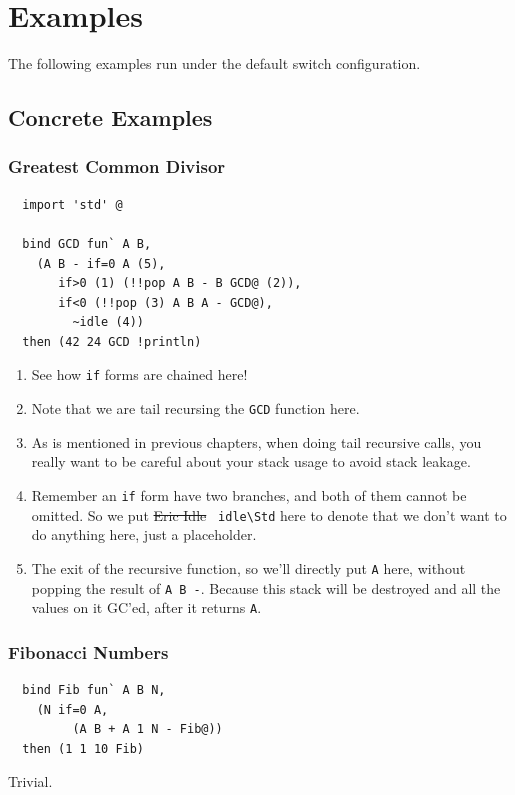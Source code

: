 \documentclass{report}
\newcommand{\mstd}[1]{\texttt{#1\textbackslash Std}}
\newcommand{\mtilde}[1]{\textasciitilde}
\begin{document}
\chapter{Examples}
\label{chap:examples}

The following examples run under the default switch configuration.

\section{Concrete Examples}

\subsection{Greatest Common Divisor}
\begin{mdframed}[style=example]
\begin{verbatim}
  import 'std' @

  bind GCD fun` A B,
    (A B - if=0 A (5),
       if>0 (1) (!!pop A B - B GCD@ (2)),
       if<0 (!!pop (3) A B A - GCD@),
         ~idle (4))
  then (42 24 GCD !println)
\end{verbatim}
\end{mdframed}

\begin{enumerate}
\item See how \texttt{if} forms are chained here!
\item Note that we are tail recursing the \texttt{GCD} function here.
\item As is mentioned in previous chapters, when doing tail recursive calls, you really want to be careful about your stack usage to avoid stack leakage.
\item Remember an \texttt{if} form have two branches, and both of them cannot be omitted. So we put \sout{Eric Idle} \mstd{\mtilde ~idle} here to denote that we don't want to do anything here, just a placeholder.
\item The exit of the recursive function, so we'll directly put \texttt{A} here, without popping the result of \texttt{A B -}. Because this stack will be destroyed and all the values on it GC'ed, after it returns \texttt{A}.
\end{enumerate}

\subsection{Fibonacci Numbers}
\begin{mdframed}[style=example]
\begin{verbatim}
  bind Fib fun` A B N,
    (N if=0 A,
         (A B + A 1 N - Fib@))
  then (1 1 10 Fib)
\end{verbatim}
\end{mdframed}
Trivial.
\end{document}
